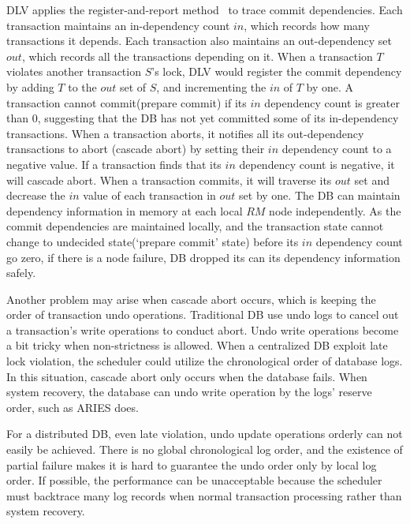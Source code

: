 \documentclass[conference]{IEEEtran}
\begin{document}
DLV applies the register-and-report method~\cite{HeckatonMVCC:journals/pvldb/LarsonBDFPZ11} to trace commit dependencies.
Each transaction maintains an in-dependency count ${in}$, which records how many transactions it depends.
Each transaction also maintains an out-dependency set  ${out}$, which records all the transactions depending on it.
When a transaction ${T}$ violates another transaction ${S}$'s lock,
DLV would register the commit dependency by adding ${T}$ to the ${out}$ set of ${S}$, and incrementing the ${in}$ of ${T}$ by one.
A transaction cannot commit(prepare commit) if its ${in}$ dependency count is greater than 0, suggesting that the DB has not yet committed some of its in-dependency transactions.
When a transaction aborts, it notifies all its out-dependency transactions to abort (cascade abort) by setting their ${in}$ dependency count to a negative value.
If a transaction finds that its ${in}$ dependency count is negative, it will cascade abort.
When a transaction commits, it will traverse its ${out}$ set and decrease the ${in}$ value of each transaction in ${out}$ set by one.
The DB can maintain dependency information in memory at each local $RM$ node independently.
As the commit dependencies are maintained locally, and the transaction state cannot change to undecided state(`prepare commit' state) before its ${in}$ dependency count go zero,
if there is a node failure,  DB dropped its can its dependency information safely. 

Another problem may arise when cascade abort occurs,
which is keeping the order of transaction undo operations. 
Traditional DB use undo logs to cancel out a transaction's write operations to conduct abort.
Undo write operations become a bit tricky when non-strictness is allowed.
When a centralized DB exploit late lock violation, the scheduler could utilize the chronological order of database logs.
In this situation, cascade abort only occurs when the database fails.
When system recovery, the database can undo write operation by the logs' reserve order, such as ARIES \cite{ARIES:journals/tods/MohanHLPS92} does.

For a distributed DB, even late violation, undo update operations orderly can not easily be achieved.
There is no global chronological log order, and the existence of partial failure makes it is hard to guarantee the undo order only by local log order.
If possible, the performance can be unacceptable because the scheduler must backtrace many log records when normal transaction processing rather than system recovery.
\end{document}

